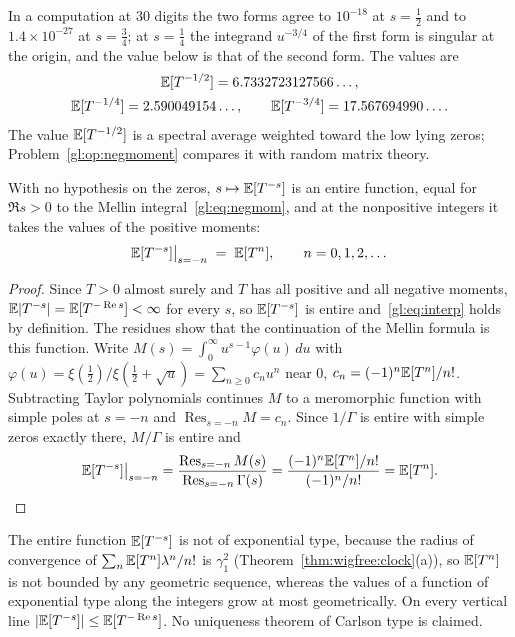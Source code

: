 In a computation at $30$ digits the two forms agree to $10^{-18}$ at $s=\tfrac12$ and to $1.4\times10^{-27}$ at $s=\tfrac34$; at $s=\tfrac14$ the integrand $u^{-3/4}$ of the first form is singular at the origin, and the value below is that of the second form. The values are
\begin{gather*}
\mathbb{E}[T^{-1/2}]=6.7332723127566\ldots,\\
\mathbb{E}[T^{-1/4}]=2.590049154\ldots,\qquad
\mathbb{E}[T^{-3/4}]=17.567694990\ldots.
\end{gather*}
The value $\mathbb{E}[T^{-1/2}]$ is a spectral average weighted toward the low lying zeros; Problem~\ref{gl:op:negmoment} compares it with random matrix theory.

\begin{proposition}\label{gl:prop:interp}
With no hypothesis on the zeros, $s\mapsto\mathbb{E}[T^{-s}]$ is an entire function, equal for $\Re s>0$ to the Mellin integral~\eqref{gl:eq:negmom}, and at the nonpositive integers it takes the values of the positive moments:
\begin{equation}\label{gl:eq:interp}
\mathbb{E}[T^{-s}]\big|_{s=-n} \;=\; \mathbb{E}[T^{n}],\qquad n=0,1,2,\dots
\end{equation}
\end{proposition}

\begin{proof}
Since $T>0$ almost surely and $T$ has all positive and all negative moments, $\mathbb{E}|T^{-s}|=\mathbb{E}[T^{-\operatorname{Re} s}]<\infty$ for every $s$, so $\mathbb{E}[T^{-s}]$ is entire and~\eqref{gl:eq:interp} holds by definition. The residues show that the continuation of the Mellin formula is this function. Write $M(s)=\int_0^\infty u^{s-1}\varphi(u)\,du$ with $\varphi(u)=\xi(\tfrac12)/\xi(\tfrac12+\sqrt u)=\sum_{n\ge0}c_nu^n$ near $0$, $c_n=(-1)^n\mathbb{E}[T^n]/n!$. Subtracting Taylor polynomials continues $M$ to a meromorphic function with simple poles at $s=-n$ and $\operatorname*{Res}_{s=-n}M = c_n$. Since $1/\Gamma$ is entire with simple zeros exactly there, $M/\Gamma$ is entire and
\[
\mathbb{E}[T^{-s}]\big|_{s=-n} = \frac{\operatorname*{Res}_{s=-n}M(s)}{\operatorname*{Res}_{s=-n}\Gamma(s)}
= \frac{(-1)^n\mathbb{E}[T^n]/n!}{(-1)^n/n!} = \mathbb{E}[T^n].
\]
\end{proof}

The entire function $\mathbb{E}[T^{-s}]$ is not of exponential type, because the radius of convergence of $\sum_n\mathbb{E}[T^n]\lambda^n/n!$ is $\gamma_1^2$ (Theorem~\ref{thm:wigfree:clock}(a)), so $\mathbb{E}[T^n]$ is not bounded by any geometric sequence, whereas the values of a function of exponential type along the integers grow at most geometrically. On every vertical line $|\mathbb{E}[T^{-s}]|\le\mathbb{E}[T^{-\operatorname{Re} s}]$. No uniqueness theorem of Carlson type is claimed.

